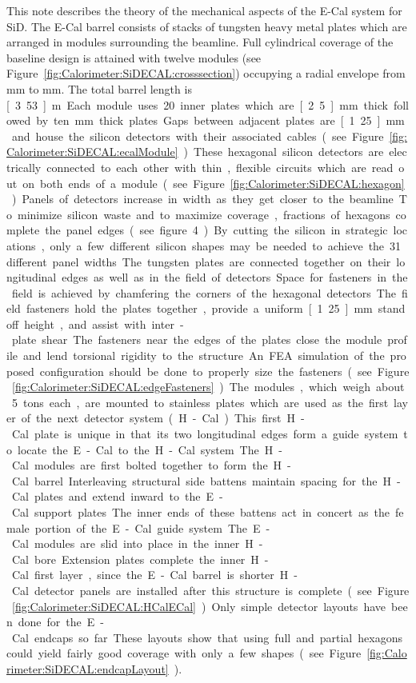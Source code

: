 This note describes the theory of the mechanical aspects of the E-Cal system for
SiD. The E-Cal barrel consists of stacks of tungsten heavy metal plates which
are arranged in modules surrounding the beamline. Full cylindrical coverage of
the baseline design is attained with twelve modules (see Figure~\ref{fig:Calorimeter:SiDECAL:crosssection}) occupying a
radial envelope from \unit[1265]{mm} to \unit[1409]{mm}. The total barrel length is \unit[3.53]{m}. Each
module uses 20 inner plates which are \unit[2.5]{mm} thick followed by ten \unit[5]{mm} thick
plates. Gaps between adjacent plates are \unit[1.25]{mm} and house the silicon detectors
with their associated cables (see Figure~\ref{fig:Calorimeter:SiDECAL:ecalModule}). These hexagonal silicon detectors
are electrically connected to each other with thin, flexible circuits which are
read out on both ends of a module (see Figure~\ref{fig:Calorimeter:SiDECAL:hexagon}). Panels of detectors increase
in width as they get closer to the beamline. To minimize silicon waste and to
maximize coverage, fractions of hexagons complete the panel edges (see figure
4). By cutting the silicon in strategic locations, only a few different silicon
shapes may be needed to achieve the 31 different panel widths. The tungsten
plates are connected together on their longitudinal edges as well as in the
field of detectors. Space for fasteners in the field is achieved by chamfering
the corners of the hexagonal detectors. The field fasteners hold the plates
together, provide a uniform \unit[1.25]{mm} standoff height, and assist with inter-plate
shear. The fasteners near the edges of the plates close the module profile and
lend torsional rigidity to the structure. An FEA simulation of the proposed
configuration should be done to properly size the fasteners (see Figure~\ref{fig:Calorimeter:SiDECAL:edgeFasteners}).The
modules, which weigh about 5 tons each, are mounted to stainless plates which
are used as the first layer of the next detector system (H-Cal). This first
H-Cal plate is unique in that its two longitudinal edges form a guide system to
locate the E-Cal to the H-Cal system. The H-Cal modules are first bolted
together to form the H-Cal barrel. Interleaving structural side battens maintain
spacing for the H-Cal plates and extend inward to the E-Cal support plates. The
inner ends of these battens act in concert as the female portion of the E-Cal
guide system. The E-Cal modules are slid into place in the inner H-Cal bore.
Extension plates complete the inner H-Cal first layer, since the E-Cal barrel is
shorter. H-Cal detector panels are installed after this structure is complete
(see Figure~\ref{fig:Calorimeter:SiDECAL:HCalECal}). Only simple detector layouts have been done for the E-Cal
endcaps so far. These layouts show that using full and partial hexagons could
yield fairly good coverage with only a few shapes. (see Figure~\ref{fig:Calorimeter:SiDECAL:endcapLayout}).
